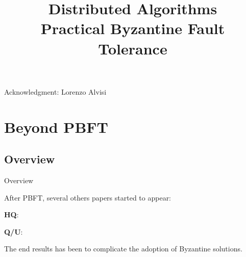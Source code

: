\title[DS - BFT]{\textbf{Distributed Algorithms}\\Practical Byzantine Fault Tolerance}


\newcommand{\Retreat}{\textsc{retreat}}

\newcommand{\Request}{\textsc{request}}
\newcommand{\Preprepare}{\textsc{pre-prepare}}
\newcommand{\Prepare}{\textsc{prepare}}
\newcommand{\Commit}{\textsc{commit}}
\newcommand{\Reply}{\textsc{commit}}
\newcommand{\Checkpoint}{\textsc{checkpoint}}
\newcommand{\ViewChange}{\textsc{view-change}}
\newcommand{\NewView}{\textsc{new-view}}

\newcommand{\Prepared}{\mathbf{prepared}}
\newcommand{\Committed}{\mathbf{committed}}








\begin{frame}
\titlepage

{\footnotesize
Acknowledgment: Lorenzo Alvisi
}


\end{frame}




\section{Beyond PBFT}

\subsection{Overview}

\begin{frame}{Overview}
	
After PBFT, several others papers started to appear:
\BIL
\item \textbf{HQ}: 
\item \textbf{Q/U}: 
\EIL

The end results has been to complicate the adoption of Byzantine solutions.

\end{frame}


